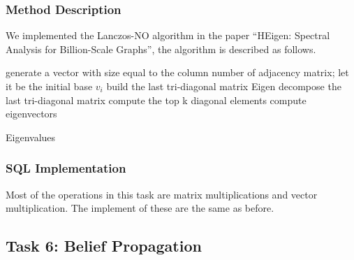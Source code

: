 \subsubsection{Method Description}
We implemented the Lanczos-NO algorithm in the paper “HEigen: Spectral Analysis for Billion-Scale Graphs”\cite{KangMF12}, the algorithm is described as follows.\\
\begin{algorithm}[htbp]
	\SetAlgoLined
	generate a vector with size equal to the column number of adjacency matrix; let it be the initial base $v_i$\;
	build the last tri-diagonal matrix\;
	Eigen decompose the last tri-diagonal matrix\;
	compute the top k diagonal elements\;
	compute eigenvectors\;
	\caption{Eigenvalues}
	\label{ev}
\end{algorithm}

\subsubsection{SQL Implementation}
Most of the operations in this task are matrix multiplications and vector multiplication. The implement of these are the same as before. 


\subsection{Task 6: Belief Propagation}
